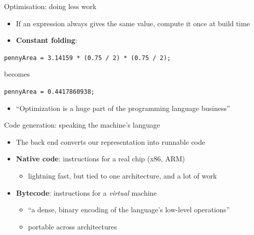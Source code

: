 \documentclass[
  ignorenonframetext,
]{beamer}
\providecommand{\tightlist}{%
  \setlength{\itemsep}{0pt}\setlength{\parskip}{0pt}}
\begin{document}
\begin{frame}[fragile]{Optimisation: doing less work}
\label{optimisation-doing-less-work}
\begin{itemize}
\tightlist
\item
  If an expression always gives the same value, compute it once at build
  time
\item
  \textbf{Constant folding}:
\end{itemize}

\vspace{0.5em}

\texttt{pennyArea\ =\ 3.14159\ *\ (0.75\ /\ 2)\ *\ (0.75\ /\ 2);}

becomes

\texttt{pennyArea\ =\ 0.4417860938;}

\begin{itemize}
\tightlist
\item
  ``Optimization is a huge part of the programming language business''
\end{itemize}

\end{frame}

\begin{frame}{Code generation: speaking the machine's language}
\label{code-generation-speaking-the-machines-language}
\begin{itemize}
\tightlist
\item
  The back end converts our representation into runnable code
\item
  \textbf{Native code}: instructions for a real chip (x86, ARM)

  \begin{itemize}
  \tightlist
  \item
    lightning fast, but tied to one architecture, and a lot of work
  \end{itemize}
\item
  \textbf{Bytecode}: instructions for a \emph{virtual} machine

  \begin{itemize}
  \tightlist
  \item
    ``a dense, binary encoding of the language's low-level operations''
  \item
    portable across architectures
  \end{itemize}
\end{itemize}

\end{frame}
\end{document}
